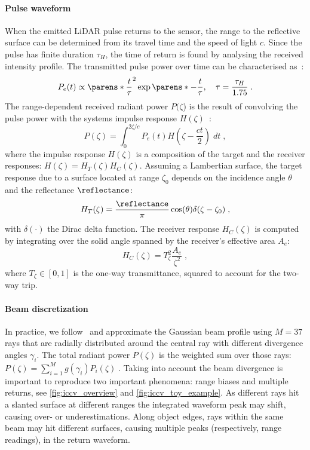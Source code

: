 \paragraph{Pulse waveform}
When the emitted LiDAR pulse returns to the sensor, the range to the reflective surface can be determined from its travel time and the speed of light $c$. Since the pulse has finite duration $\tau_H$, the time of return is found by analysing the received intensity profile. The transmitted pulse power over time can be characterised as~\cite{carlsson2001signature}:
\begin{equation}
    P_e(t) \propto \parens*{\frac{t}{\tau}}^2 \exp\parens*{-\frac{t}{\tau}},\quad \tau = \frac{\tau_H}{1.75}\;.
\label{eq:iccv_pulse}
\end{equation}
The range-dependent received radiant power $P(\zeta$) is the result of convolving the pulse power with the systems impulse response $H(\zeta)$~\cite{rasshofer2011influences,hahner2021fog,hahner2022lidar}:
\begin{equation}
    P(\zeta) = \int_0^{2\zeta/c} P_e(t) H(\zeta - \frac{ct}{2}) \; dt\;,
\end{equation}
where the impulse response $H(\zeta)$ is a composition of the target and the receiver responses: $H(\zeta) =  H_T(\zeta) H_C(\zeta)$.
Assuming a Lambertian surface, the target response due to a surface located at range $\zeta_0$ depends on the incidence angle $\theta$ and the reflectance $\reflectance$:
\begin{equation}
    H_T(\zeta) = \frac{\reflectance}{\pi} \cos(\theta) \delta(\zeta - \zeta_0)\;, 
\label{eq:iccv_ht}
\end{equation}
with $\delta(\cdot)$ the Dirac delta function.
The receiver response $H_C(\zeta)$ is computed by integrating over the solid angle spanned by the receiver's effective area $A_e$:
\begin{equation}
   H_C(\zeta) = T^2_{\zeta} \frac{A_e}{\zeta^2}\;,
\label{eq:iccv_hc}
\end{equation}
where $T_{\zeta} \in [0,1]$ is the one-way transmittance, squared to account for the two-way trip.


\paragraph{Beam discretization}
In practice, we follow~\cite{winiwarter2022virtual} and approximate the Gaussian beam profile using $M\!=\!37$ rays that are radially distributed around the central ray with different divergence angles $\gamma_i$. The total radiant power $P(\zeta)$ is the weighted sum over those rays: $P(\zeta) = \sum_{i=1}^M g(\gamma_i) P_i(\zeta)\;.$
Taking into account the beam divergence is important to reproduce two important phenomena: range biases and multiple returns, see \cref{fig:iccv_overview} and \cref{fig:iccv_toy_example}. As different rays hit a slanted surface at different ranges the integrated waveform peak may shift, causing over- or underestimations. Along object edges, rays within the same beam may hit different surfaces, causing multiple peaks (respectively, range readings), in the return waveform.


